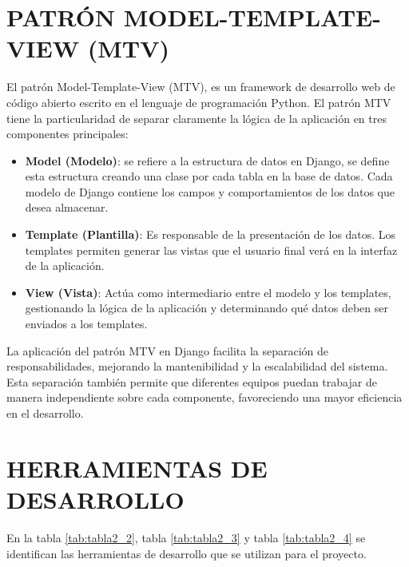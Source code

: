 	\section{PATRÓN MODEL-TEMPLATE-VIEW (MTV)}
		
		El patrón Model-Template-View (MTV), es un framework de desarrollo web de código abierto escrito en el lenguaje de programación Python. El patrón MTV tiene la particularidad de separar claramente la lógica de la aplicación en tres componentes principales:
		
		\begin{itemize}[label=$\bullet$, left=0cm, labelsep = 1.05cm, topsep = 0pt, parsep = 0pt]
			\item \textbf{Model (Modelo)}: se refiere a la estructura de datos en Django, se define esta estructura creando una clase por cada tabla en la base de datos. Cada modelo de Django contiene los campos y comportamientos de los datos que desea almacenar.
			\item \textbf{Template (Plantilla)}: Es responsable de la presentación de los datos. Los templates permiten generar las vistas que el usuario final verá en la interfaz de la aplicación.
			\item \textbf{View (Vista)}: Actúa como intermediario entre el modelo y los templates, gestionando la lógica de la aplicación y determinando qué datos deben ser enviados a los templates.
		\end{itemize}
		
		La aplicación del patrón MTV en Django facilita la separación de responsabilidades, mejorando la mantenibilidad y la escalabilidad del sistema. Esta separación también permite que diferentes equipos puedan trabajar de manera independiente sobre cada componente, favoreciendo una mayor eficiencia en el desarrollo.		
	
	\section{HERRAMIENTAS DE DESARROLLO}
		En la tabla \ref{tab:tabla2_2}, tabla \ref{tab:tabla2_3} y tabla \ref{tab:tabla2_4} se identifican las herramientas de desarrollo que se utilizan para el proyecto.
		
